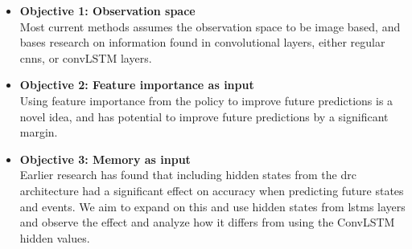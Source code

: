 \documentclass[UKenglish]{uiomasterthesis}
\begin{document}
\begin{itemize}

    \item \textbf{Objective 1: Observation space}\\
        Most current methods assumes the observation space to be image based, and bases research on information found in convolutional layers, either regular \acp{cnn}, or convLSTM layers.

    \item \textbf{Objective 2: Feature importance as input}\\
        Using feature importance from the policy to improve future predictions is a novel idea, and has potential to improve future predictions by a significant margin.

    \item \textbf{Objective 3: Memory as input}\\
        Earlier research has found that including hidden states from the \ac{drc} architecture had a significant effect on accuracy when predicting future states and events. We aim to expand on this and use hidden states from \acp{lstm} layers and observe the effect and analyze how it differs from using the ConvLSTM hidden values.

\end{itemize}
\end{document}
